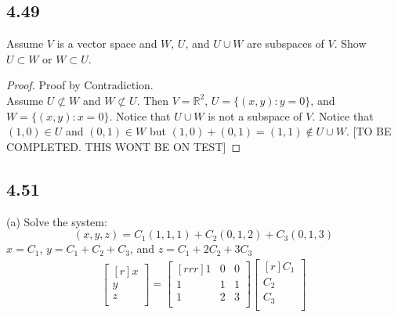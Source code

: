 \documentclass{report}
\begin{document}
\subsection{4.49}
Assume $V$ is a vector space and $W$, $U$, and $U \cup W$ are subspaces of $V$. Show $U \subset W$ or $W \subset U$.\\
\begin{proof}
Proof by Contradiction.\\
Assume $U \not\subset W$ and $W \not\subset U$. Then $V=\mathbb{R}^2$, $U=\{(x,y):y=0\}$, and $W=\{(x,y):x=0\}$. Notice that $U \cup W$ is not a subspace of $V$. Notice that $(1,0)\in U$ and $(0,1) \in W$ but $(1,0)+(0,1)=(1,1) \not\in U \cup W$. [TO BE COMPLETED. THIS WONT BE ON TEST]
\end{proof}

\subsection{4.51}
(a) Solve the system:\\
\[ (x,y,z)=C_1(1,1,1) + C_2(0,1,2)+C_3(0,1,3) \]
$x=C_1$, $y=C_1+C_2+C_3$, and $z=C_1+2C_2+3C_3$
\begin{align*}
\begin{bmatrix}[r]x\\y\\z\\ \end{bmatrix}
= \begin{bmatrix}[rrr]1&0&0\\1&1&1\\1&2&3\\ \end{bmatrix}
\begin{bmatrix}[r]C_1\\C_2\\C_3\\ \end{bmatrix}
\end{align*}
\end{document}
